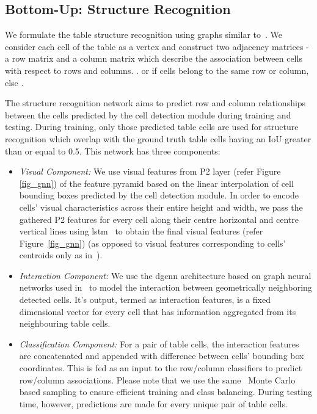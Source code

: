 \documentclass[runningheads]{llncs}
\begin{document}
\subsection{Bottom-Up: Structure Recognition}
                     
We formulate the table structure recognition using graphs similar to~\cite{qasim2019rethinking}. We consider each cell of the table as a vertex and construct two adjacency matrices - a row matrix  and a column matrix  which describe the association between cells with respect to rows and columns. .  or  if cells  belong to the same row or column, else .

The structure recognition network aims to predict row and column relationships between the cells predicted by the cell detection module during training and testing. During training, only those predicted table cells are used for structure recognition which overlap with the ground truth table cells having an IoU greater than or equal to 0.5. This network has three components:
\begin{itemize}
    \item \textit{Visual Component:} We use visual features from P2 layer (refer Figure  \ref{fig_gnn}) of the feature pyramid based on the linear interpolation of cell bounding boxes predicted by the cell detection module. In order to encode cells' visual characteristics across their entire height and width, we pass the gathered P2 features for every cell along their centre horizontal and centre vertical lines using {\sc lstm}~\cite{hochreiter1997long} to obtain the final visual features (refer Figure~\ref{fig_gnn}) (as opposed to visual features corresponding to cells' centroids only as in~\cite{qasim2019learning}).
    \item \textit{Interaction Component:} We use the {\sc dgcnn} architecture based on graph neural networks used in~\cite{qasim2019learning} to model the interaction between geometrically neighboring detected cells. It's output, termed as interaction features, is a fixed dimensional vector for every cell that has information aggregated from its neighbouring table cells.
    \item \textit{Classification Component:} For a pair of table cells, the interaction features are concatenated and appended with difference between cells' bounding box coordinates. This is fed as an input to the row/column classifiers to predict row/column associations. Please note that we use the same~\cite{qasim2019learning} Monte Carlo based sampling to ensure efficient training and class balancing. During testing time, however, predictions are made for every unique pair of table cells.
\end{itemize}
\end{document}
